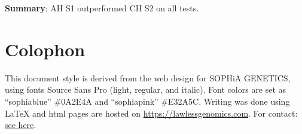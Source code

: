 \documentclass{article}
\begin{document}
\textbf{Summary}: AH S1 outperformed CH S2 on all tests.

\section{Colophon}
This document style is derived from the web design for SOPHiA GENETICS, using fonts  Source Sans Pro (light, regular, and italic).
Font colors are set as ``sophiablue'' \#0A2E4A and  ``sophiapink'' \#E32A5C.
Writing was done using LaTeX and html pages are hosted on 
\href{https://lawlessgenomics.com}{https://lawlessgenomics.com}.
For contact:  \href{https://lawlessgenomics.com/resume/pdf/Dylan_Lawless.pdf}{see here}.


\end{document}
